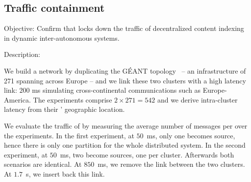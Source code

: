 

\begin{asparadesc}



\subsection{Traffic containment}
\item [Objective:] Confirm that \NAME locks down the traffic of
  decentralized content indexing in dynamic
  inter-autonomous systems.
  
\item [Description:]

We build a network by duplicating the G{\'E}ANT
topology~\cite{knight2011internet} -- an infrastructure of 271 \nodes
spanning across Europe -- and we link these two clusters with a high
latency link: $200$ ms simulating cross-continental communications
such as Europe-America. The experiments comprise $2 \times 271 = 542$
\processes and we derive intra-cluster latency from their \processes'
geographic location.

\noindent We evaluate the traffic of \NAME by measuring the average
number of messages per \process over the experiments. In the first
experiment, at $50$~ms, only one \process becomes source, hence there
is only one partition for the whole distributed system. In the second
experiment, at $50$~ms, two \processes become sources, one per
cluster. Afterwards both scenarios are identical. At $850$~ms, we
remove the link between the two clusters. At $1.7$~s, we insert back
this link.





\end{asparadesc}
